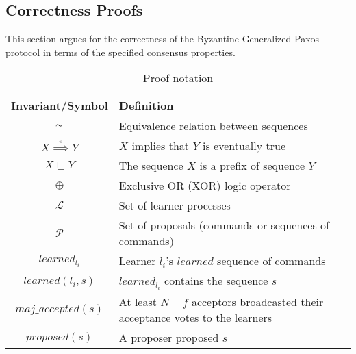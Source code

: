 \subsection{Correctness Proofs}

This section argues for the correctness of the Byzantine Generalized Paxos protocol in terms of the specified consensus properties.\par


\begin{table}[h!]
	\renewcommand{\arraystretch}{1.5}
	\centering
	\begin{tabularx}{\linewidth}{ |c|X|}
		\hline
		Invariant/Symbol & Definition \\
		\hline
		$\thicksim$ & Equivalence relation between sequences \\
		\hline
		$X \overset{e}{\implies} Y$ & $X$ implies that $Y$ is eventually true \\
		\hline
		$X \sqsubseteq Y$ & The sequence $X$ is a prefix of sequence $Y$ \\
		\hline
		$\oplus$ & Exclusive OR (XOR) logic operator \\
		\hline
		$\mathcal{L}$ & Set of learner processes \\
		\hline
		$\mathcal{P}$ & Set of proposals (commands or sequences of commands) \\
		\hline
		$learned_{l_i}$ & Learner $l_i$'s $learned$ sequence of commands \\
		\hline
		$learned(l_i,s)$ & $learned_{l_i}$ contains the sequence $s$ \\
		\hline
		$maj\_accepted(s)$ & At least $N-f$ acceptors broadcasted their acceptance votes to the learners\\
		\hline
		$proposed(s)$ & A proposer proposed $s$ \\
		\hline
		
  	\end{tabularx} 
	\caption{Proof notation} 
	\label{table:1}
\end{table}

